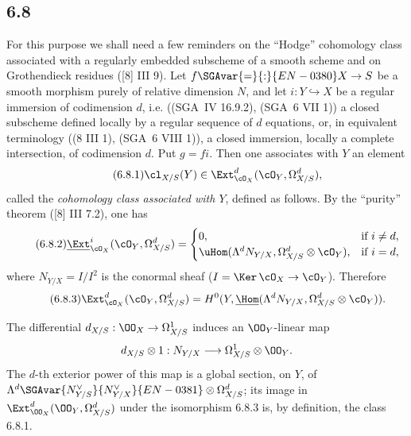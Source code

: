 \subsection*{6.8}
For this purpose we shall need a few reminders on the ``Hodge'' cohomology class associated with a regularly embedded subscheme of a smooth scheme and on Grothendieck residues ([8] III 9). Let $f\SGAvar{=}{:}{EN-0380}X\to S$ be a smooth morphism purely of relative dimension $N$, and let $i:Y\hookrightarrow X$ be a regular immersion of codimension $d$, i.e. ((SGA~IV 16.9.2), (SGA~6 VII 1)) a closed subscheme defined locally by a regular sequence of $d$ equations, or, in equivalent terminology ((8 III 1), (SGA~6 VIII 1)), a closed immersion, locally a complete intersection, of codimension $d$. Put $g=fi$. Then one associates with $Y$ an element
\begin{equation}
\tag{6.8.1}
\cl_{X/S}(Y)\in\Ext^d_{\cO_X}(\cO_Y,\Omega^d_{X/S}),
\end{equation}
called the \emph{cohomology class associated with $Y$}, defined as follows. By the ``purity'' theorem ([8] III 7.2), one has
\begin{equation}
\tag{6.8.2}
\underline{\Ext}^i_{\cO_X}(\cO_Y,\Omega^d_{X/S})=
\begin{cases}
0,& \text{if } i\ne d,\\
\uHom(\Lambda^d N_{Y/X},\Omega^d_{X/S}\otimes\cO_Y),& \text{if } i=d,
\end{cases}
\end{equation}
where $N_{Y/X}=I/I^2$ is the conormal sheaf ($I=\Ker\,\cO_X\to\cO_Y$). Therefore
\begin{equation}
\tag{6.8.3}
\Ext^d_{\cO_X}(\cO_Y,\Omega^d_{X/S})=H^0(Y,\underline{\Hom}(\Lambda^dN_{Y/X},\Omega^d_{X/S}\otimes\cO_Y)).
\end{equation}

The differential $d_{X/S}:\OO_X\to\Omega^1_{X/S}$ induces an $\OO_Y$-linear map
\[
d_{X/S}\otimes 1:N_{Y/X}\longrightarrow \Omega^1_{X/S}\otimes\OO_Y.
\]
The $d$-th exterior power of this map is a global section, on $Y$, of $\Lambda^d \SGAvar{N_{Y/S}^{\vee}}{N_{Y/X}^{\vee}}{EN-0381}\otimes\Omega^d_{X/S}$; its image in $\Ext^d_{\OO_X}(\OO_Y,\Omega^d_{X/S})$ under the isomorphism 6.8.3 is, by definition, the class 6.8.1.

